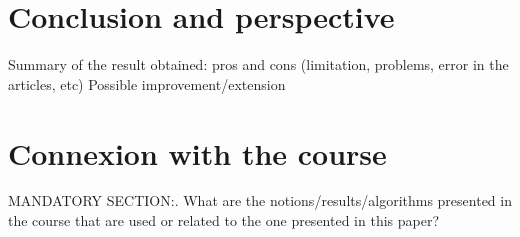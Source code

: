 




\section{Conclusion and perspective}

Summary of the result obtained: pros and cons (limitation, problems, error in the articles, etc)
Possible improvement/extension 

\section{Connexion with the course}

MANDATORY SECTION:. What are the notions/results/algorithms presented in the course that are used or related to the one presented in this paper?

\listoftodos{}

\newpage
\printbibliography[heading=bibintoc]

